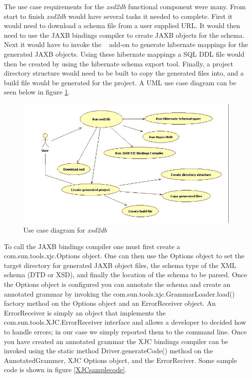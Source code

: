 The use case requirements for the \emph{xsd2db} functional component were many.  From start to finish \emph{xsd2db} would have several tasks it needed to complete.  First it would need to download a schema file from a user supplied URL.  It would then need to use the JAXB bindings compiler to create JAXB objects for the schema.  Next it would have to invoke the ~ add-on to generate hibernate mappings for the generated JAXB objects.  Using these hibernate mappings a SQL DDL file would then be created by using the hibernate schema export tool.  Finally, a project directory structure would need to be built to copy the generated files into, and  a build file would be generated for the project.  A UML use case diagram can be seen below in figure \ref{xsd2dbUMLUseCase}.

\begin{figure}[htbp]
\begin{center}
\includegraphics[scale=0.5]{./Images/xsd2dbUseCase.jpg}
\caption{Use case diagram for \emph{xsd2db}}
\label{xsd2dbUMLUseCase}
\end{center}
\end{figure}
To call the JAXB bindings compiler one must first create a  com.sun.tools.xjc.Options object.  One can then use the Options object to set the target directory for generated JAXB object files, the schema type of the XML schema (DTD or XSD), and finally the location of the schema to be parsed.  Once the Options object is configured you can annotate the schema and create an annotated grammar by invoking the com.sun.tools.xjc.GrammarLoader.load()  factory method on the Options object and an ErrorReceiver object.  An ErrorReceiver is simply an object that implements the com.sun.tools.XJC.ErrorReceiver interface and allows a developer to decided how to handle errors;  in our case we simply reported them to the command line.   Once you have created an annotated grammar the XJC bindings compiler can be invoked using the static method Driver.generateCode() method on the AnnotatedGrammer, XJC Options object, and the ErrorReciver.  Some sample code is shown in figure \ref{XJCsamplecode}.
